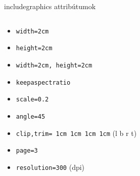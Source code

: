 \documentclass{beamer} %
\begin{document}
\begin{frame}[fragile]{includegraphics attribútumok}
 \begin{columns}
  \begin{column}{0.7\textwidth}
   \begin{itemize}
    \item \lstinline|width=2cm|
    \item \lstinline|height=2cm|
    \item \lstinline|width=2cm, height=2cm|
    \item \lstinline|keepaspectratio|
    \item \lstinline|scale=0.2|
    \item \lstinline|angle=45|
    \item \lstinline|clip,trim= 1cm 1cm 1cm 1cm| (l b r t)
    \item \lstinline|page=3| 
    \item \lstinline|resolution=300| (dpi)
   \end{itemize}
   

\end{column}
\end{columns}
\end{frame}
\end{document}
